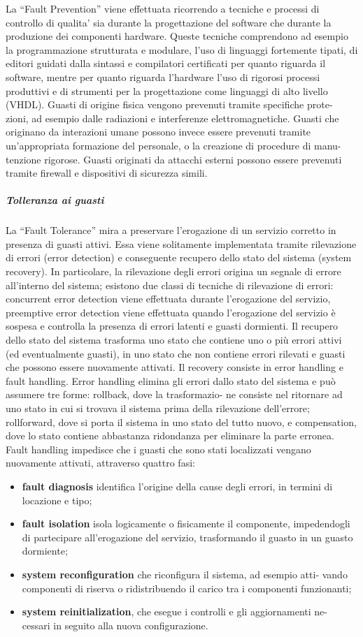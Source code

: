 \documentclass[14pt]{extarticle}
\begin{document}
La “Fault Prevention” viene effettuata ricorrendo a tecniche e processi di controllo di qualita’ sia durante la progettazione del software che durante la produzione dei componenti hardware. Queste tecniche comprendono ad esempio
la programmazione strutturata e modulare, l’uso di linguaggi fortemente tipati, di editori guidati dalla sintassi e compilatori certificati per quanto riguarda
il software, mentre per quanto riguarda l’hardware l’uso di rigorosi processi
produttivi e di strumenti per la progettazione come linguaggi di alto livello
(VHDL). Guasti di origine fisica vengono prevenuti tramite specifiche prote-
zioni, ad esempio dalle radiazioni e interferenze elettromagnetiche. Guasti
che originano da interazioni umane possono invece essere prevenuti tramite
un’appropriata formazione del personale, o la creazione di procedure di manu-
tenzione rigorose. Guasti originati da attacchi esterni possono essere prevenuti
tramite firewall e dispositivi di sicurezza simili.
\subparagraph{Tolleranza ai guasti}
La “Fault Tolerance” mira a preservare l’erogazione di un servizio corretto in
presenza di guasti attivi. Essa viene solitamente implementata tramite rilevazione di errori (error detection) e conseguente recupero dello stato del sistema
(system recovery). In particolare, la rilevazione degli errori origina un segnale
di errore all’interno del sistema; esistono due classi di tecniche di rilevazione
di errori: concurrent error detection viene effettuata durante l’erogazione del
servizio, preemptive error detection viene effettuata quando l’erogazione del
servizio è sospesa e controlla la presenza di errori latenti e guasti dormienti.
Il recupero dello stato del sistema trasforma uno stato che contiene uno o più
errori attivi (ed eventualmente guasti), in uno stato che non contiene errori
rilevati e guasti che possono essere nuovamente attivati. Il recovery consiste
in error handling e fault handling. Error handling elimina gli errori dallo
stato del sistema e può assumere tre forme: rollback, dove la trasformazio-
ne consiste nel ritornare ad uno stato in cui si trovava il sistema prima della
rilevazione dell’errore; rollforward, dove si porta il sistema in uno stato del
tutto nuovo, e compensation, dove lo stato contiene abbastanza ridondanza
per eliminare la parte erronea. Fault handling impedisce che i guasti che sono
stati localizzati vengano nuovamente attivati, attraverso quattro fasi:
\begin{itemize}
\item \textbf{fault diagnosis} identifica l’origine della cause degli errori, in termini di
locazione e tipo;
\item \textbf{fault isolation} isola logicamente o fisicamente il componente, impedendogli di partecipare all’erogazione del servizio, trasformando il guasto in
un guasto dormiente;
\item \textbf{system reconfiguration} che riconfigura il sistema, ad esempio atti-
vando componenti di riserva o ridistribuendo il carico tra i componenti
funzionanti;
\item \textbf{system reinitialization}, che esegue i controlli e gli aggiornamenti ne-
cessari in seguito alla nuova configurazione.

\end{itemize}
\end{document}
